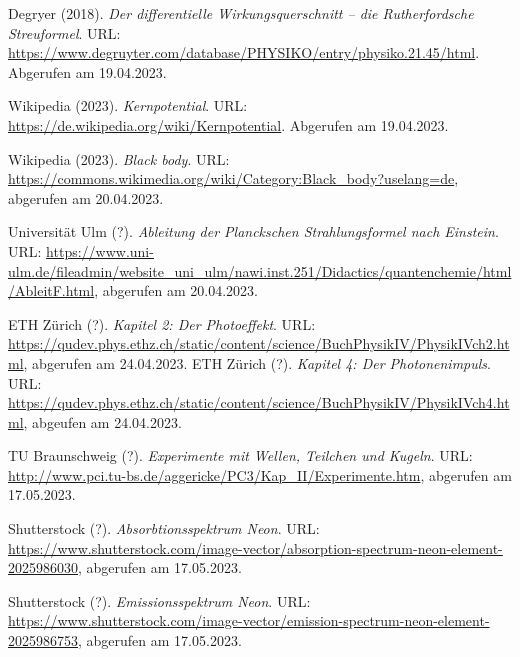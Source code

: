 \begin{thebibliography}{99}
     Degryer (2018). \emph{Der differentielle Wirkungsquerschnitt – die Rutherfordsche Streuformel}. URL: \url{https://www.degruyter.com/database/PHYSIKO/entry/physiko.21.45/html}. Abgerufen am 19.04.2023. 

     Wikipedia (2023). \emph{Kernpotential}. URL: \url{https://de.wikipedia.org/wiki/Kernpotential}. Abgerufen am 19.04.2023. 

     Wikipedia (2023). \emph{Black body}. URL: \url{https://commons.wikimedia.org/wiki/Category:Black_body?uselang=de}, abgerufen am 20.04.2023.

     Universität Ulm (?). \emph{Ableitung der Planckschen Strahlungsformel nach Einstein}. URL: \url{https://www.uni-ulm.de/fileadmin/website_uni_ulm/nawi.inst.251/Didactics/quantenchemie/html/AbleitF.html}, abgerufen am 20.04.2023.

     ETH Zürich (?). \emph{Kapitel 2: Der Photoeffekt}. URL: \url{https://qudev.phys.ethz.ch/static/content/science/BuchPhysikIV/PhysikIVch2.html}, abgerufen am 24.04.2023.
     ETH Zürich (?). \emph{Kapitel 4: Der Photonenimpuls}. URL: \url{https://qudev.phys.ethz.ch/static/content/science/BuchPhysikIV/PhysikIVch4.html}, abgeufen am 24.04.2023.  

     TU Braunschweig (?). \emph{Experimente mit Wellen, Teilchen und Kugeln}. URL: \url{http://www.pci.tu-bs.de/aggericke/PC3/Kap_II/Experimente.htm}, abgerufen am 17.05.2023. 

     Shutterstock (?). \emph{Absorbtionsspektrum Neon}. URL: \url{https://www.shutterstock.com/image-vector/absorption-spectrum-neon-element-2025986030}, abgerufen am 17.05.2023.

     Shutterstock (?). \emph{Emissionsspektrum Neon}. URL: \url{https://www.shutterstock.com/image-vector/emission-spectrum-neon-element-2025986753}, abgerufen am 17.05.2023.
\end{thebibliography}